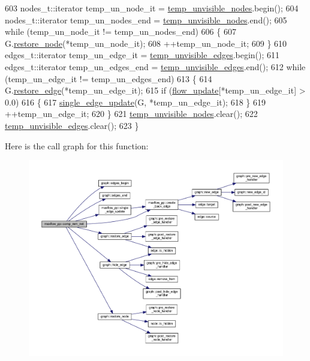 \begin{DoxyCode}
603     nodes\_t::iterator temp\_un\_node\_it = \mbox{\hyperlink{classmaxflow__pp_a0510a162f178364f36794e10022cda49}{temp\_unvisible\_nodes}}.begin();
604     nodes\_t::iterator temp\_un\_nodes\_end = \mbox{\hyperlink{classmaxflow__pp_a0510a162f178364f36794e10022cda49}{temp\_unvisible\_nodes}}.end();
605     \textcolor{keywordflow}{while} (temp\_un\_node\_it != temp\_un\_nodes\_end)
606     \{
607     G.\mbox{\hyperlink{classgraph_ab57aab79e649cc275052b7decbdd03ec}{restore\_node}}(*temp\_un\_node\_it);
608     ++temp\_un\_node\_it;
609     \}
610     edges\_t::iterator temp\_un\_edge\_it = \mbox{\hyperlink{classmaxflow__pp_aae17915904c0d17632df70aac9fe88b0}{temp\_unvisible\_edges}}.begin();
611     edges\_t::iterator temp\_un\_edges\_end = \mbox{\hyperlink{classmaxflow__pp_aae17915904c0d17632df70aac9fe88b0}{temp\_unvisible\_edges}}.end();
612     \textcolor{keywordflow}{while} (temp\_un\_edge\_it != temp\_un\_edges\_end)
613     \{
614     G.\mbox{\hyperlink{classgraph_a2e5426682a0897b9f9104b019970bedc}{restore\_edge}}(*temp\_un\_edge\_it);
615     \textcolor{keywordflow}{if} (\mbox{\hyperlink{classmaxflow__pp_ad37aff831935b2cfd4b03bc4a6da06ce}{flow\_update}}[*temp\_un\_edge\_it] > 0.0)
616     \{
617         \mbox{\hyperlink{classmaxflow__pp_a3e59652a416d1553f8a1d1229dd2cd38}{single\_edge\_update}}(G, *temp\_un\_edge\_it);
618     \}
619     ++temp\_un\_edge\_it;
620     \}
621     \mbox{\hyperlink{classmaxflow__pp_a0510a162f178364f36794e10022cda49}{temp\_unvisible\_nodes}}.clear();
622     \mbox{\hyperlink{classmaxflow__pp_aae17915904c0d17632df70aac9fe88b0}{temp\_unvisible\_edges}}.clear();
623 \}
\end{DoxyCode}
Here is the call graph for this function\+:\nopagebreak
\begin{figure}[H]
\begin{center}
\leavevmode
\includegraphics[width=350pt]{classmaxflow__pp_a97612b9517f0f11715610cb8faa81606_cgraph}
\end{center}
\end{figure}

